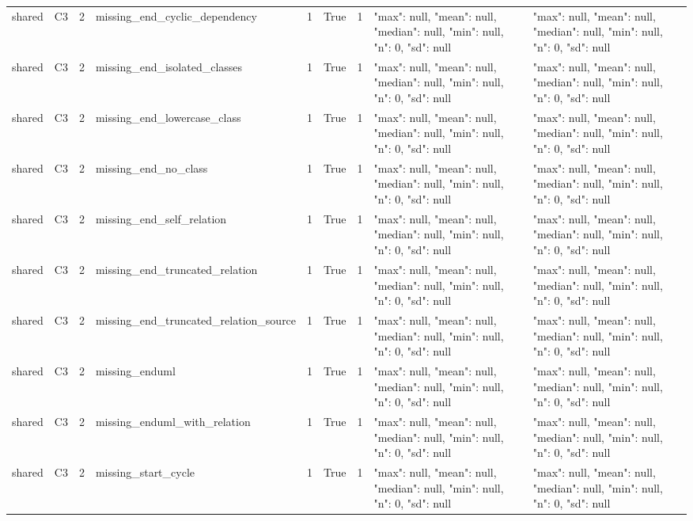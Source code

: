 \begin{tabular}{lllllllll}
shared & C3 & 2 & missing\_end\_cyclic\_dependency & 1 & True & 1 & {"max": null, "mean": null, "median": null, "min": null, "n": 0, "sd": null} & {"max": null, "mean": null, "median": null, "min": null, "n": 0, "sd": null} \\
shared & C3 & 2 & missing\_end\_isolated\_classes & 1 & True & 1 & {"max": null, "mean": null, "median": null, "min": null, "n": 0, "sd": null} & {"max": null, "mean": null, "median": null, "min": null, "n": 0, "sd": null} \\
shared & C3 & 2 & missing\_end\_lowercase\_class & 1 & True & 1 & {"max": null, "mean": null, "median": null, "min": null, "n": 0, "sd": null} & {"max": null, "mean": null, "median": null, "min": null, "n": 0, "sd": null} \\
shared & C3 & 2 & missing\_end\_no\_class & 1 & True & 1 & {"max": null, "mean": null, "median": null, "min": null, "n": 0, "sd": null} & {"max": null, "mean": null, "median": null, "min": null, "n": 0, "sd": null} \\
shared & C3 & 2 & missing\_end\_self\_relation & 1 & True & 1 & {"max": null, "mean": null, "median": null, "min": null, "n": 0, "sd": null} & {"max": null, "mean": null, "median": null, "min": null, "n": 0, "sd": null} \\
shared & C3 & 2 & missing\_end\_truncated\_relation & 1 & True & 1 & {"max": null, "mean": null, "median": null, "min": null, "n": 0, "sd": null} & {"max": null, "mean": null, "median": null, "min": null, "n": 0, "sd": null} \\
shared & C3 & 2 & missing\_end\_truncated\_relation\_source & 1 & True & 1 & {"max": null, "mean": null, "median": null, "min": null, "n": 0, "sd": null} & {"max": null, "mean": null, "median": null, "min": null, "n": 0, "sd": null} \\
shared & C3 & 2 & missing\_enduml & 1 & True & 1 & {"max": null, "mean": null, "median": null, "min": null, "n": 0, "sd": null} & {"max": null, "mean": null, "median": null, "min": null, "n": 0, "sd": null} \\
shared & C3 & 2 & missing\_enduml\_with\_relation & 1 & True & 1 & {"max": null, "mean": null, "median": null, "min": null, "n": 0, "sd": null} & {"max": null, "mean": null, "median": null, "min": null, "n": 0, "sd": null} \\
shared & C3 & 2 & missing\_start\_cycle & 1 & True & 1 & {"max": null, "mean": null, "median": null, "min": null, "n": 0, "sd": null} & {"max": null, "mean": null, "median": null, "min": null, "n": 0, "sd": null} \\

\end{tabular}
